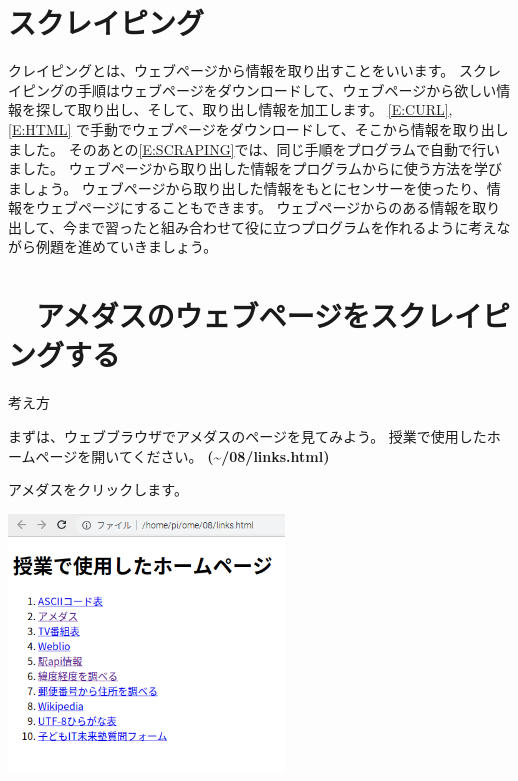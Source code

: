 
\clearpage
{}\label{P:scraping}
\section{スクレイピング}
クレイピングとは、ウェブページから情報を取り出すことをいいます。
スクレイピングの手順はウェブページをダウンロードして、ウェブページから欲しい情報を探して取り出し、そして、取り出し情報を加工します。
\ref*{E:CURL},\ref*{E:HTML}
で手動でウェブページをダウンロードして、そこから情報を取り出しました。
そのあとの\ref*{E:SCRAPING}では、同じ手順をプログラムで自動で行いました。
ウェブページから取り出した情報をプログラムからに使う方法を学びましょう。
ウェブページから取り出した情報をもとにセンサーを使ったり、情報をウェブページにすることもできます。
ウェブページからのある情報を取り出して、今まで習ったと組み合わせて役に立つプログラムを作れるように考えながら例題を進めていきましょう。



\bigskip
{}
\clearpage\section{\theExercise　アメダスのウェブページをスクレイピングする}
\addtocounter{Exercise}{-1}\label{E:amedas}
考え方

まずは、ウェブブラウザでアメダスのページを見てみよう。
授業で使用したホームページを開いてください。
\textbf{({\textasciitilde}/08/links.html)}

アメダスをクリックします。



\begin{center}
\includegraphics[width=0.55\textwidth]{./text08-img/textbook-img017.png}

\end{center}



